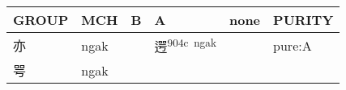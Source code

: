 \documentclass[14pt,a4paper]{scrartcl}
\begin{document}
\begin{longtable}[c]{@{}llllll@{}}
\toprule
\begin{minipage}[b]{0.14\columnwidth}\raggedright\strut
GROUP
\strut\end{minipage} &
\begin{minipage}[b]{0.14\columnwidth}\raggedright\strut
MCH
\strut\end{minipage} &
\begin{minipage}[b]{0.14\columnwidth}\raggedright\strut
B
\strut\end{minipage} &
\begin{minipage}[b]{0.14\columnwidth}\raggedright\strut
A
\strut\end{minipage} &
\begin{minipage}[b]{0.14\columnwidth}\raggedright\strut
none
\strut\end{minipage} &
\begin{minipage}[b]{0.14\columnwidth}\raggedright\strut
PURITY
\strut\end{minipage}\tabularnewline
\midrule
\endhead
\begin{minipage}[t]{0.14\columnwidth}\raggedright\strut
亦
\strut\end{minipage} &
\begin{minipage}[t]{0.14\columnwidth}\raggedright\strut
ngak
\strut\end{minipage} &
\begin{minipage}[t]{0.14\columnwidth}\raggedright\strut
\strut\end{minipage} &
\begin{minipage}[t]{0.14\columnwidth}\raggedright\strut
遌\textsuperscript{904c~ngak}
\strut\end{minipage} &
\begin{minipage}[t]{0.14\columnwidth}\raggedright\strut
\strut\end{minipage} &
\begin{minipage}[t]{0.14\columnwidth}\raggedright\strut
pure:A
\strut\end{minipage}\tabularnewline
\begin{minipage}[t]{0.14\columnwidth}\raggedright\strut
咢
\strut\end{minipage} &
\begin{minipage}[t]{0.14\columnwidth}\raggedright\strut
ngak
\strut\end{minipage} &
\begin{minipage}[t]{0.14\columnwidth}\raggedright\strut
\strut\end{minipage} &
\begin{minipage}[t]{0.14\columnwidth}\raggedright\strut

\end{minipage}
\end{longtable}
\end{document}
